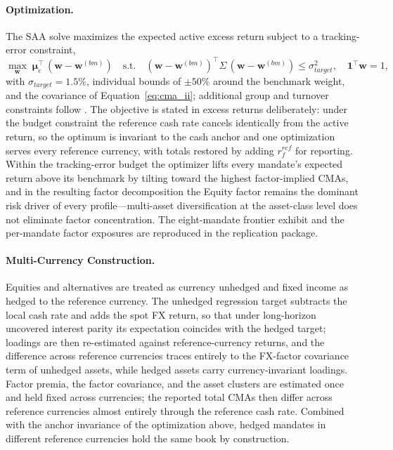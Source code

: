 \documentclass[pdftex,12pt,a4paper]{article}
\begin{document}
\paragraph*{Optimization.} The SAA solve maximizes the expected active excess return subject to a tracking-error constraint,
\begin{equation}\label{eq:saa1}
	\max_{\boldsymbol w} \; \boldsymbol\mu_e^{\intercal}\,(\boldsymbol w - \boldsymbol w^{(bm)})
	\quad \text{s.t.} \quad
	(\boldsymbol w - \boldsymbol w^{(bm)})^{\intercal} \Sigma\, (\boldsymbol w - \boldsymbol w^{(bm)}) \le \sigma^2_{target}, \quad \boldsymbol 1^\intercal \boldsymbol w = 1,
\end{equation}
with $\sigma_{target} = 1.5\%$, individual bounds of $\pm 50\%$ around the benchmark weight, and the covariance of Equation~\eqref{eq:cma_ii}; additional group and turnover constraints follow \cite{Rosaa2026}. The objective is stated in excess returns deliberately: under the budget constraint the reference cash rate cancels identically from the active return, so the optimum is invariant to the cash anchor and one optimization serves every reference currency, with totals restored by adding $r_f^{ref}$ for reporting. Within the tracking-error budget the optimizer lifts every mandate's expected return above its benchmark by tilting toward the highest factor-implied CMAs, and in the resulting factor decomposition the Equity factor remains the dominant risk driver of every profile---multi-asset diversification at the asset-class level does not eliminate factor concentration. The eight-mandate frontier exhibit and the per-mandate factor exposures are reproduced in the replication package.

\paragraph*{Multi-Currency Construction.} Equities and alternatives are treated as currency unhedged and fixed income as hedged to the reference currency. The unhedged regression target subtracts the local cash rate and adds the spot FX return, so that under long-horizon uncovered interest parity its expectation coincides with the hedged target; loadings are then re-estimated against reference-currency returns, and the difference across reference currencies traces entirely to the FX-factor covariance term of unhedged assets, while hedged assets carry currency-invariant loadings. Factor premia, the factor covariance, and the asset clusters are estimated once and held fixed across currencies; the reported total CMAs then differ across reference currencies almost entirely through the reference cash rate. Combined with the anchor invariance of the optimization above, hedged mandates in different reference currencies hold the same book by construction.
\end{document}
